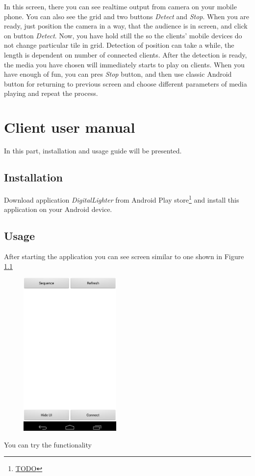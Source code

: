 In this screen, there you can see realtime output from camera on your mobile phone.
You can also see the grid and two buttons \emph{Detect} and \emph{Stop}.
When you are ready, just position the camera in a way, that the audience is in screen, and click on button \emph{Detect}.
Now, you have hold still the so the clients' mobile devices do not change particular tile in grid.
Detection of position can take a while, the length is dependent on number of connected clients.
After the detection is ready, the media you have chosen will immediately starts to play on clients.
When you have enough of fun, you can pres \emph{Stop} button, and then use classic Android button for returning to previous screen and choose different parameters of media playing and repeat the process.

\chapter{Client user manual}
In this part, installation and usage guide will be presented.
\section{Installation}
Download application \emph{DigitalLighter} from Android Play store\footnote{\url{TODO}} and install this application on your Android device.
\section{Usage}
After starting the application you can see screen similar to one shown in Figure \ref{fig:manual_client}

\begin{figure}[h]
	\centering
		\includegraphics[width=5cm]{appendix/client1.png}
	\caption{}
	\label{fig:manual_client}
\end{figure}

You can try the functionality 